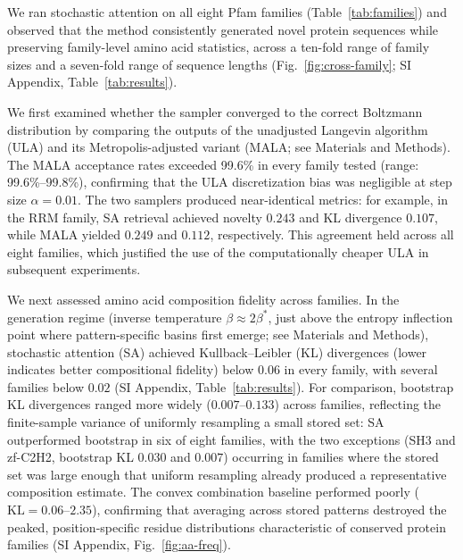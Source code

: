 
We ran stochastic attention on all eight Pfam families (Table~\ref{tab:families}) and observed that the method consistently generated novel protein sequences while preserving family-level amino acid statistics, across a ten-fold range of family sizes and a seven-fold range of sequence lengths (Fig.~\ref{fig:cross-family}; SI Appendix, Table~\ref{tab:results}).

We first examined whether the sampler converged to the correct Boltzmann distribution by comparing the outputs of the unadjusted Langevin algorithm (ULA) and its Metropolis-adjusted variant (MALA; see Materials and Methods). The MALA acceptance rates exceeded 99.6\% in every family tested (range: 99.6\%--99.8\%), confirming that the ULA discretization bias was negligible at step size $\alpha{=}0.01$. The two samplers produced near-identical metrics: for example, in the RRM family, SA retrieval achieved novelty $0.243$ and KL divergence $0.107$, while MALA yielded $0.249$ and $0.112$, respectively. This agreement held across all eight families, which justified the use of the computationally cheaper ULA in subsequent experiments.

We next assessed amino acid composition fidelity across families. In the generation regime (inverse temperature $\beta \approx 2\beta^*$, just above the entropy inflection point where pattern-specific basins first emerge; see Materials and Methods), stochastic attention (SA) achieved Kullback--Leibler (KL) divergences (lower indicates better compositional fidelity) below $0.06$ in every family, with several families below $0.02$ (SI Appendix, Table~\ref{tab:results}). For comparison, bootstrap KL divergences ranged more widely ($0.007$--$0.133$) across families, reflecting the finite-sample variance of uniformly resampling a small stored set: SA outperformed bootstrap in six of eight families, with the two exceptions (SH3 and zf-C2H2, bootstrap KL $0.030$ and $0.007$) occurring in families where the stored set was large enough that uniform resampling already produced a representative composition estimate. The convex combination baseline performed poorly ($\mathrm{KL}{=}0.06$--$2.35$), confirming that averaging across stored patterns destroyed the peaked, position-specific residue distributions characteristic of conserved protein families (SI Appendix, Fig.~\ref{fig:aa-freq}).

